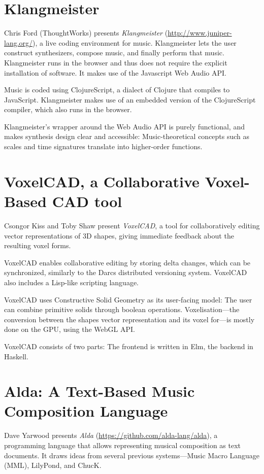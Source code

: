 \documentclass{sigplanconf}
\begin{document}
\section{Klangmeister}

Chris Ford (ThoughtWorks) presents \textit{Klangmeister} (\url{http://www.juniper-lang.org/}), a live
coding environment for music.  Klangmeister lets the user construct
synthesizers, compose music, and finally perform that music.
Klangmeister runs in the browser and thus does not require the
explicit installation of software.  It makes use of the Javascript Web
Audio API.

Music is coded using ClojureScript, a dialect of Clojure that
compiles to JavaScript.  Klangmeister makes use of 
an embedded version of the ClojureScript compiler, which also runs in the
browser.

Klangmeister's wrapper around the Web Audio API is purely functional,
and makes synthesis design clear and accessible:  Music-theoretical
concepts such as scales and time signatures translate into
higher-order functions.

\section{VoxelCAD, a Collaborative Voxel-Based CAD tool}

Csongor Kiss and Toby Shaw present \textit{VoxelCAD}, a tool for
collaboratively editing vector representations of 3D shapes, giving
immediate feedback about the resulting voxel forms.

VoxelCAD enables collaborative editing by storing delta changes, which
can be synchronized, similarly to the Darcs distributed versioning
system.  VoxelCAD also includes a Lisp-like scripting language.

VoxelCAD uses Constructive Solid Geometry as its user-facing model:
The user can combine primitive solids through boolean operations.
Voxelisation---the conversion between the shapes vector representation
and its voxel for---is mostly done on the GPU, using the WebGL API.

VoxelCAD consists of two parts: The frontend is written in Elm, the
backend in Haskell.

\section{Alda: A Text-Based Music Composition Language}

Dave Yarwood presents \textit{Alda} (\url{https://github.com/alda-lang/alda}), a programming language that
allows representing musical composition as text documents.  It draws
ideas from several previous systems---Music Macro Language (MML),
LilyPond,  and ChucK.
\end{document}
